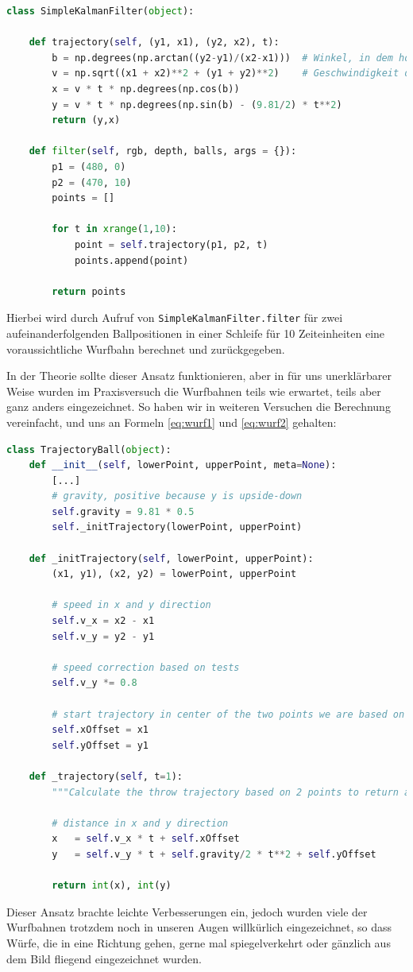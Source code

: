 \documentclass[12pt,a4paper,ngerman]{scrartcl}
\begin{document}
\begin{lstlisting}[language=Python]
class SimpleKalmanFilter(object):

    def trajectory(self, (y1, x1), (y2, x2), t):
        b = np.degrees(np.arctan((y2-y1)/(x2-x1)))  # Winkel, in dem hochgeworfen wird
        v = np.sqrt((x1 + x2)**2 + (y1 + y2)**2)    # Geschwindigkeit des Balls
        x = v * t * np.degrees(np.cos(b))
        y = v * t * np.degrees(np.sin(b) - (9.81/2) * t**2)
        return (y,x)

    def filter(self, rgb, depth, balls, args = {}):
        p1 = (480, 0)
        p2 = (470, 10)
        points = []

        for t in xrange(1,10):
            point = self.trajectory(p1, p2, t)
            points.append(point)

        return points
\end{lstlisting}
Hierbei wird durch Aufruf von {\tt SimpleKalmanFilter.filter} für zwei aufeinanderfolgenden Ballpositionen in einer Schleife für 10 Zeiteinheiten eine voraussichtliche Wurfbahn berechnet und zurückgegeben.

In der Theorie sollte dieser Ansatz funktionieren, aber in für uns unerklärbarer Weise wurden im Praxisversuch die Wurfbahnen teils wie erwartet, teils aber ganz anders eingezeichnet. So haben wir in weiteren Versuchen die Berechnung vereinfacht, und uns an Formeln \ref{eq:wurf1} und \ref{eq:wurf2} gehalten:

\begin{lstlisting}[language=Python]
class TrajectoryBall(object):
    def __init__(self, lowerPoint, upperPoint, meta=None):
        [...]
        # gravity, positive because y is upside-down
        self.gravity = 9.81 * 0.5
        self._initTrajectory(lowerPoint, upperPoint)

    def _initTrajectory(self, lowerPoint, upperPoint):
        (x1, y1), (x2, y2) = lowerPoint, upperPoint

        # speed in x and y direction
        self.v_x = x2 - x1
        self.v_y = y2 - y1

        # speed correction based on tests
        self.v_y *= 0.8

        # start trajectory in center of the two points we are based on
        self.xOffset = x1
        self.yOffset = y1

    def _trajectory(self, t=1):
        """Calculate the throw trajectory based on 2 points to return any future or past point on that trajectory"""

        # distance in x and y direction
        x   = self.v_x * t + self.xOffset
        y   = self.v_y * t + self.gravity/2 * t**2 + self.yOffset

        return int(x), int(y)
\end{lstlisting}
Dieser Ansatz brachte leichte Verbesserungen ein, jedoch wurden viele der Wurfbahnen trotzdem noch in unseren Augen willkürlich eingezeichnet, so dass Würfe, die in eine Richtung gehen, gerne mal spiegelverkehrt oder gänzlich aus dem Bild fliegend eingezeichnet wurden.
\end{document}
